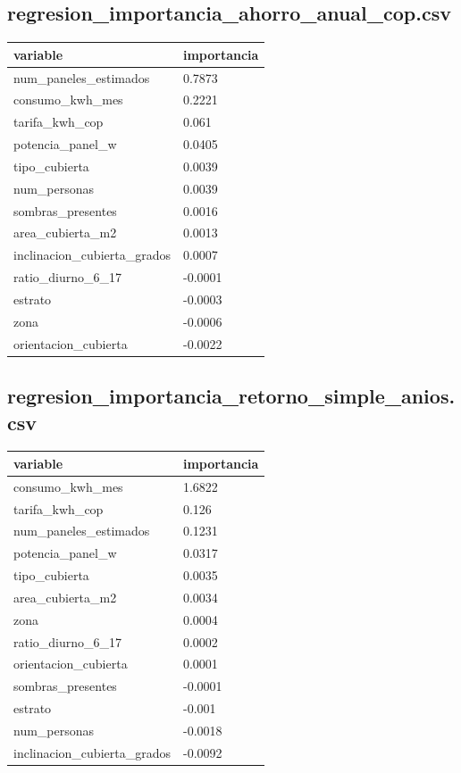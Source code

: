 \subsection*{regresion\_importancia\_ahorro\_anual\_cop.csv}
{\footnotesize\begin{longtable}{@{}p{}l@{}}
\toprule
variable & importancia \\
\midrule\endhead
num\_paneles\_estimados & 0.7873 \\
consumo\_kwh\_mes & 0.2221 \\
tarifa\_kwh\_cop & 0.061 \\
potencia\_panel\_w & 0.0405 \\
tipo\_cubierta & 0.0039 \\
num\_personas & 0.0039 \\
sombras\_presentes & 0.0016 \\
area\_cubierta\_m2 & 0.0013 \\
inclinacion\_cubierta\_grados & 0.0007 \\
ratio\_diurno\_6\_17 & -0.0001 \\
estrato & -0.0003 \\
zona & -0.0006 \\
orientacion\_cubierta & -0.0022 \\
\bottomrule
\end{longtable}}
\subsection*{regresion\_importancia\_retorno\_simple\_anios.csv}
{\footnotesize\begin{longtable}{@{}p{}l@{}}
\toprule
variable & importancia \\
\midrule\endhead
consumo\_kwh\_mes & 1.6822 \\
tarifa\_kwh\_cop & 0.126 \\
num\_paneles\_estimados & 0.1231 \\
potencia\_panel\_w & 0.0317 \\
tipo\_cubierta & 0.0035 \\
area\_cubierta\_m2 & 0.0034 \\
zona & 0.0004 \\
ratio\_diurno\_6\_17 & 0.0002 \\
orientacion\_cubierta & 0.0001 \\
sombras\_presentes & -0.0001 \\
estrato & -0.001 \\
num\_personas & -0.0018 \\
inclinacion\_cubierta\_grados & -0.0092 \\
\bottomrule
\end{longtable}}
